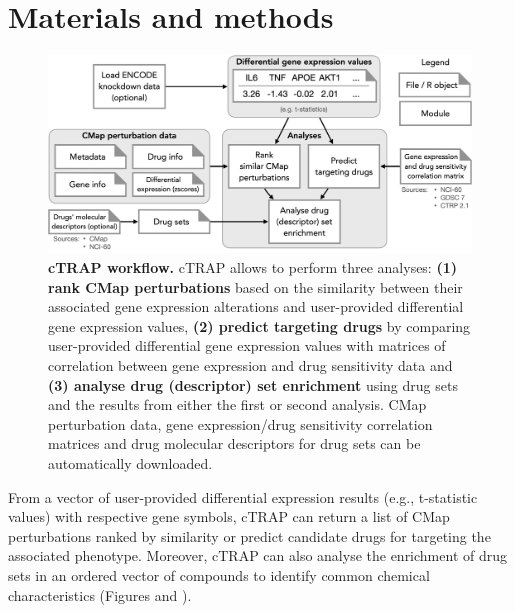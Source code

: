 \section{Materials and methods}

\begin{figure}[!b]
  \includegraphics[width=.8\textwidth]{images/ctrap/workflow}
  \centering
  \caption[cTRAP workflow]{\textbf{cTRAP workflow.} cTRAP allows to perform three analyses: \textbf{(1) rank CMap perturbations} based on the similarity between their associated gene expression alterations and user-provided differential gene expression values, \textbf{(2) predict targeting drugs} by comparing user-provided differential gene expression values with matrices of correlation between gene expression and drug sensitivity data and \textbf{(3) analyse drug (descriptor) set enrichment} using drug sets and the results from either the first or second analysis. CMap perturbation data, gene expression/drug sensitivity correlation matrices and drug molecular descriptors for drug sets can be automatically downloaded.}
  \label{fig:ctrap-workflow}
\end{figure}

From a vector of user-provided differential expression results (e.g., t-statistic values) with respective gene symbols, cTRAP can return a list of CMap perturbations ranked by similarity or predict candidate drugs for targeting the associated phenotype. Moreover, cTRAP can also analyse the enrichment of drug sets in an ordered vector of compounds to identify common chemical characteristics (Figures  and ).

